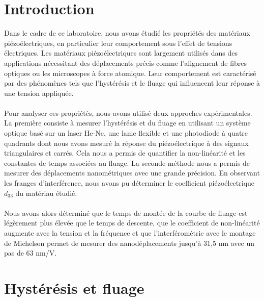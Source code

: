 \section{Introduction}
Dans le cadre de ce laboratoire, nous avons étudié les propriétés des matériaux piézoélectriques, en particulier leur comportement sous l'effet de tensions électriques. Les matériaux piézoélectriques sont largement utilisés dans des applications nécessitant des déplacements précis comme l'alignement de fibres optiques ou les microscopes à force atomique. Leur comportement est caractérisé par des phénomènes tels que l'hystérésis et le fluage qui influencent leur réponse à une tension appliquée.
\\\\
Pour analyser ces propriétés, nous avons utilisé deux approches expérimentales. La première consiste à mesurer l'hystérésis et du fluage en utilisant un système optique basé sur un laser He-Ne, une lame flexible et une photodiode à quatre quadrants dont nous avons mesuré la réponse du piézoélectrique à des signaux triangulaires et carrés. Cela nous a permis de quantifier la non-linéarité et les constantes de temps associées au fluage. La seconde méthode nous a permis de mesurer des déplacements nanométriques avec une grande précision. En observant les franges d'interférence, nous avons pu déterminer le coefficient piézoélectrique $d_{33}$ du matériau étudié.
\\\\
Nous avons alors déterminé que le temps de montée de la courbe de fluage est légèrement plus élevée que le temps de descente, que le coefficient de non-linéarité augmente avec la tension et la fréquence et que l'interférométrie avec le montage de Michelson permet de mesurer des nanodéplacements jusqu'à 31,5 nm avec un pas de 63 nm/V.

\section{Hystérésis et fluage}


